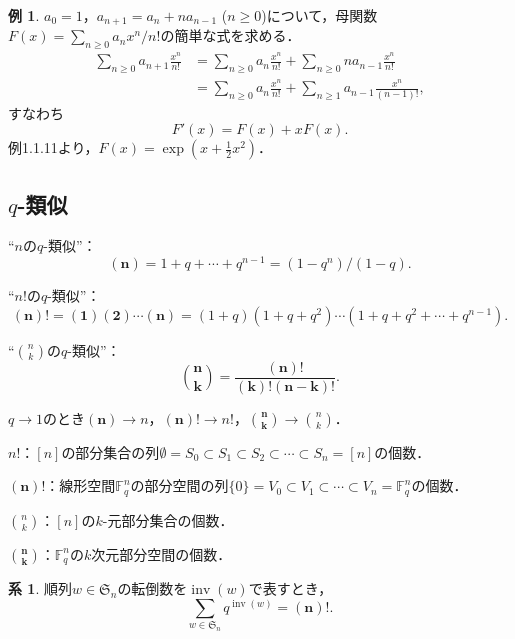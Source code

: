 \documentclass[xelatex,ja=standard,a4paper,14pt,everyparhook=compat]{bxjsarticle}
\newcommand{\paren}[1]{\left(#1\right)}
\newcommand{\bbF}{\mathbb{F}}
\newcommand{\frakS}{\mathfrak{S}}
\DeclareMathOperator{\inv}{inv}
\theoremstyle{definition}
\newtheorem{example}[theorem]{例}
\newtheorem{corollary}[theorem]{系}
\begin{document}
\begin{example}
   $a_0 = 1$，$a_{n+1} = a_n + n a_{n-1}$ ($n \geq 0$)について，母関数$F(x) = \sum_{n \geq 0} a_n x^n/n!$の簡単な式を求める． \begin{align*}
        \sum_{n \geq 0} a_{n+1} \frac{x^n}{n!}
         & = \sum_{n \geq 0} a_n \frac{x^n}{n!}
        + \sum_{n \geq 0} n a_{n-1} \frac{x^n}{n!} \\
         & = \sum_{n \geq 0} a_n \frac{x^n}{n!}
        + \sum_{n \geq 1} a_{n-1} \frac{x^n}{(n-1)!},
    \end{align*}
    すなわち \begin{equation*}
        F'(x) = F(x) + xF(x).
    \end{equation*}
    例1.1.11より，$F(x) = \exp\paren{x + \frac{1}{2} x^2}$．
\end{example}

\subsection*{$q$-類似}

``$n$の$q$-類似''： \begin{equation*}
    \pmb{(n)} = 1+q+\cdots+q^{n-1} = (1-q^n)/(1-q).
\end{equation*}

``$n!$の$q$-類似''： \begin{equation*}
    \pmb{(n)!} = \pmb{(1)(2)\cdots(n)} = (1+q)(1+q+q^2)\cdots(1+q+q^2+\cdots+q^{n-1}).
\end{equation*}

``$\binom{n}{k}$の$q$-類似''： \begin{equation*}
    \pmb{\binom{n}{k}} = \frac{\pmb{(n)!}}{\pmb{(k)!(n-k)!}}.
\end{equation*}

$q \to 1$のとき$\pmb{(n)} \to n$，$\pmb{(n)!} \to n!$，$\pmb{\binom{n}{k}} \to \binom{n}{k}$．

$n!$：$[n]$の部分集合の列$\emptyset = S_0 \subset S_1 \subset S_2 \subset \cdots \subset S_n = [n]$の個数．

$\pmb{(n)!}$：線形空間$\bbF_q^n$の部分空間の列$\{0\} = V_0 \subset V_1 \subset \cdots \subset V_n = \bbF_q^n$の個数．

$\binom{n}{k}$：$[n]$の$k$-元部分集合の個数．

$\pmb{\binom{n}{k}}$：$\bbF_q^n$の$k$次元部分空間の個数．

\setcounter{subsection}{3}
\setcounter{theorem}{12}
\begin{corollary}
    順列$w \in \frakS_n$の転倒数を$\inv(w)$で表すとき， \begin{equation*}
        \sum_{w \in \frakS_n} q^{\inv(w)} = \pmb{(n)!}.
    \end{equation*}
\end{corollary}
\end{document}
